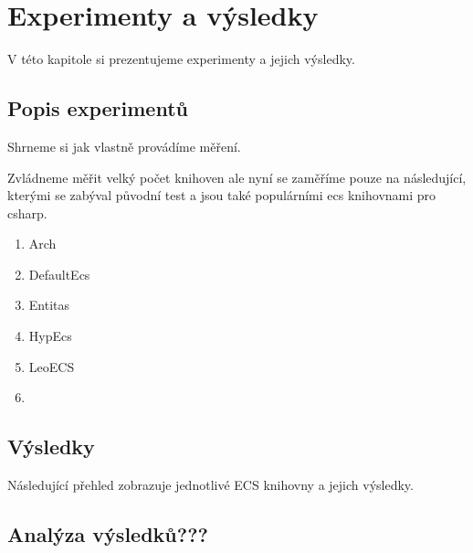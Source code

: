 \chapter{Experimenty a výsledky}
V této kapitole si prezentujeme experimenty a jejich výsledky.

\section{Popis experimentů}
Shrneme si jak vlastně provádíme měření.

Zvládneme měřit velký počet knihoven ale nyní se zaměříme pouze na následující, kterými se zabýval původní test a jsou také populárními ecs knihovnami pro csharp.

\begin{enumerate}
    \item Arch~\cite{Arch}
    \item DefaultEcs~\cite{DefaultEcs}
    \item Entitas~\cite{Entitas}
    \item HypEcs~\cite{HypEcs}
    \item LeoECS~\cite{LeoECS}
    \item {}
\end{enumerate}

\section{Výsledky}
Následující přehled zobrazuje jednotlivé ECS knihovny a jejich výsledky.

\section{Analýza výsledků???}





